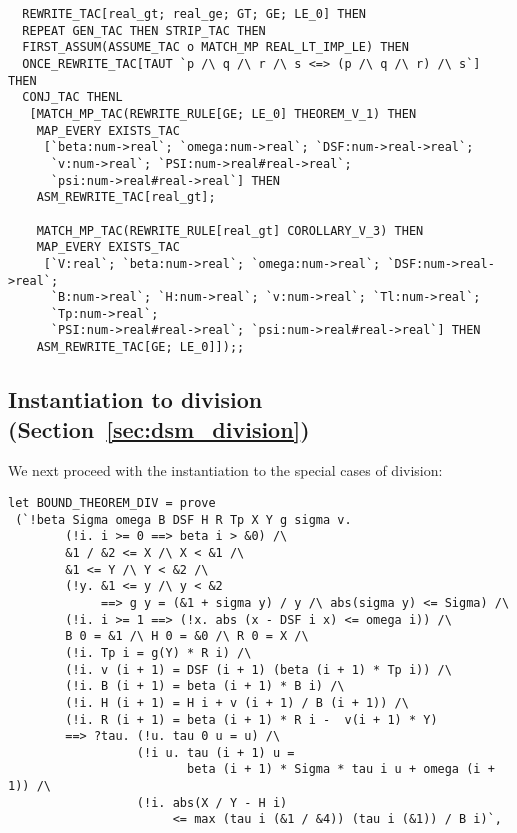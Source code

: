 \documentclass[10pt]{article}
\theoremstyle{definition}
\theoremstyle{remark}
\numberwithin{equation}{section}
\begin{document}
\begin{scriptsize}\begin{verbatim}
  REWRITE_TAC[real_gt; real_ge; GT; GE; LE_0] THEN
  REPEAT GEN_TAC THEN STRIP_TAC THEN
  FIRST_ASSUM(ASSUME_TAC o MATCH_MP REAL_LT_IMP_LE) THEN
  ONCE_REWRITE_TAC[TAUT `p /\ q /\ r /\ s <=> (p /\ q /\ r) /\ s`] THEN
  CONJ_TAC THENL
   [MATCH_MP_TAC(REWRITE_RULE[GE; LE_0] THEOREM_V_1) THEN
    MAP_EVERY EXISTS_TAC
     [`beta:num->real`; `omega:num->real`; `DSF:num->real->real`;
      `v:num->real`; `PSI:num->real#real->real`;
      `psi:num->real#real->real`] THEN
    ASM_REWRITE_TAC[real_gt];

    MATCH_MP_TAC(REWRITE_RULE[real_gt] COROLLARY_V_3) THEN
    MAP_EVERY EXISTS_TAC
     [`V:real`; `beta:num->real`; `omega:num->real`; `DSF:num->real->real`;
      `B:num->real`; `H:num->real`; `v:num->real`; `Tl:num->real`;
      `Tp:num->real`;
      `PSI:num->real#real->real`; `psi:num->real#real->real`] THEN
    ASM_REWRITE_TAC[GE; LE_0]]);;
\end{verbatim}\end{scriptsize}

\subsection{Instantiation to division (Section~\ref{sec:dsm_division})}

We next proceed with the instantiation to the special cases of division:

\begin{scriptsize}\begin{verbatim}
let BOUND_THEOREM_DIV = prove
 (`!beta Sigma omega B DSF H R Tp X Y g sigma v.
        (!i. i >= 0 ==> beta i > &0) /\
        &1 / &2 <= X /\ X < &1 /\
        &1 <= Y /\ Y < &2 /\
        (!y. &1 <= y /\ y < &2
             ==> g y = (&1 + sigma y) / y /\ abs(sigma y) <= Sigma) /\
        (!i. i >= 1 ==> (!x. abs (x - DSF i x) <= omega i)) /\
        B 0 = &1 /\ H 0 = &0 /\ R 0 = X /\
        (!i. Tp i = g(Y) * R i) /\
        (!i. v (i + 1) = DSF (i + 1) (beta (i + 1) * Tp i)) /\
        (!i. B (i + 1) = beta (i + 1) * B i) /\
        (!i. H (i + 1) = H i + v (i + 1) / B (i + 1)) /\
        (!i. R (i + 1) = beta (i + 1) * R i -  v(i + 1) * Y)
        ==> ?tau. (!u. tau 0 u = u) /\
                  (!i u. tau (i + 1) u =
                         beta (i + 1) * Sigma * tau i u + omega (i + 1)) /\
                  (!i. abs(X / Y - H i)
                       <= max (tau i (&1 / &4)) (tau i (&1)) / B i)`,
\end{verbatim}\end{scriptsize}
\end{document}
